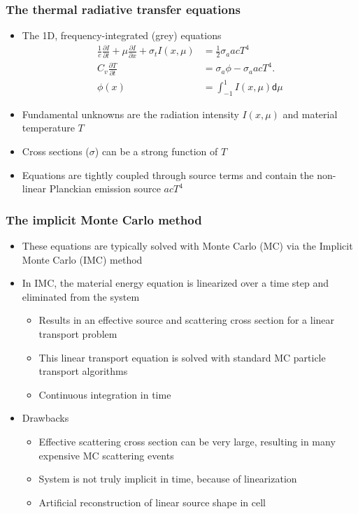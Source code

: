 \documentclass[xcolor=dvipsnames,handout,hyperref={pdfpagelabels=false}]{beamer}
\newcommand{\colb}[1]{{\color{blue} #1}}
\newlength{\wideitemsep}
\let\olditem\item
\renewcommand{\item}{\setlength{\itemsep}{\wideitemsep}\olditem}
\newcommand{\pderiv}[2]{\frac{\partial #1}{\partial #2}}
\renewcommand{\d}{\mathsf{d}}
\begin{document}
\begin{frame}
\frametitle{The thermal radiative transfer equations}
\begin{itemize}
\item The 1D, frequency-integrated (grey) equations
\begin{align}\label{ho_cont}
    \frac{1}{c}\pderiv{I}{t} + \mu \pderiv{I}{x} + \sigma_t I(x,\mu)
&= \frac{1}{2} \sigma_a a c T^4
  \\
  C_v \pderiv{T}{t} &=  \sigma_a \phi - \sigma_a a c T^4. \\
   \phi(x) &= \int_{-1}^1 I(x,\mu) \d \mu
\end{align}
        \item Fundamental unknowns are the radiation intensity $I(x,\mu)$ and material
            temperature $T$
        \item Cross sections ($\sigma$) can be a strong function of $T$
        \item Equations are tightly coupled through source terms and contain the non-linear Planckian emission source $a c T^4$
\end{itemize}

\end{frame}

\begin{frame}
\frametitle{The implicit Monte Carlo method}
\begin{itemize}
\item These equations are typically solved with Monte Carlo (MC) via the Implicit Monte Carlo (IMC) method
\item In IMC, the material energy equation is linearized \colb{over a time step} and eliminated from the system
    \begin{itemize}
        \item Results in an effective source and scattering cross section for a \colb{linear} transport problem
\item This linear transport equation is solved with standard MC particle transport
    algorithms
\item Continuous integration in time
    \end{itemize}
\item Drawbacks 
\begin{itemize}
\item Effective scattering cross section can be very large, resulting in many
    expensive MC scattering events
\item System is not truly implicit in time, because of linearization
\item Artificial reconstruction of linear source shape in cell
\end{itemize}
\end{itemize}
\end{frame}
\end{document}
